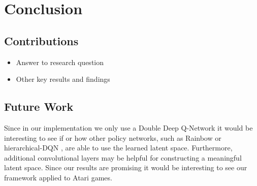 \section{Conclusion}
\label{sec:conclusion}

\subsection{Contributions}
\label{subsec:contributions}
\begin{itemize}
	\item Answer to research question
	\item Other key results and findings
\end{itemize}

\subsection{Future Work}
\label{subsec:futurework}
Since in our implementation we only use a Double Deep Q-Network it would be interesting to see if or how other policy networks, such as Rainbow \citep{rainbow} or hierarchical-DQN \citep{hierarchicalDeepRL}, are able to use the learned latent space. Furthermore, additional convolutional layers may be helpful for constructing a meaningful latent space. Since our results are promising it would be interesting to see our framework applied to Atari games.
